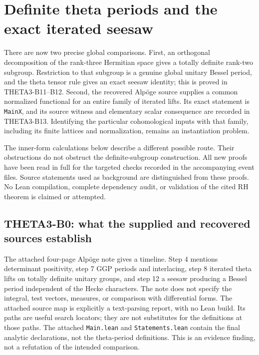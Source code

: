 \documentclass[11pt]{article}
\theoremstyle{definition}\newtheorem{definition}[theorem]{Definition}\newtheorem{remark}[theorem]{Remark}
\begin{document}
\section{Definite theta periods and the exact iterated seesaw}

There are now two precise global comparisons. First, an orthogonal decomposition of the rank-three Hermitian space gives a totally definite rank-two subgroup. Restriction to that subgroup is a genuine global unitary Bessel period, and the theta tensor rule gives an exact seesaw identity; this is proved in THETA3-B11--B12. Second, the recovered Alp\"oge source supplies a common normalized functional for an entire family of iterated lifts. Its exact statement is \texttt{MainX}, and its source witness and elementary scalar consequence are recorded in THETA3-B13. Identifying the particular cohomological inputs with that family, including its finite lattices and normalization, remains an instantiation problem.

The inner-form calculations below describe a different possible route. Their obstructions do not obstruct the definite-subgroup construction. All new proofs have been read in full for the targeted checks recorded in the accompanying event files. Source statements used as background are distinguished from these proofs. No Lean compilation, complete dependency audit, or validation of the cited RH theorem is claimed or attempted.

\subsection{THETA3-B0: what the supplied and recovered sources establish}\label{B0}

The attached four-page Alp\"oge note gives a timeline. Step 4 mentions determinant positivity, step 7 GGP periods and interlacing, step 8 iterated theta lifts on totally definite unitary groups, and step 12 a seesaw producing a Bessel period independent of the Hecke characters. The note does not specify the integral, test vectors, measures, or comparison with differential forms. The attached source map is explicitly a text-parsing report, with no Lean build. Its paths are useful search locators; they are not substitutes for the definitions at those paths. The attached \texttt{Main.lean} and \texttt{Statements.lean} contain the final analytic declarations, not the theta-period definitions. This is an evidence finding, not a refutation of the intended comparison.
\end{document}

